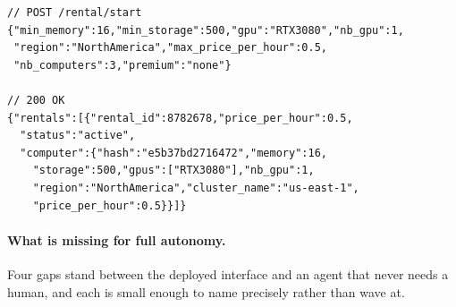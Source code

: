 \begin{lstlisting}[float=htbp, floatplacement=htbp,
  caption={\FluxEdge \texttt{POST /\allowbreak{}rental/\allowbreak{}start}: a representative agent-facing
request and response \srccode{pouwbackend/\allowbreak{}rest\_api/\allowbreak{}v1/\allowbreak{}openapi.yaml}{1330-1338,1358-1382}. The
request names criteria, not a specific machine, and \texttt{max\_price\_per\_hour} bounds this
one call. Nothing in the request, the response, or the bearer token that authorized the call
bounds what the same credential may spend across repeated calls --- the gap \S17
specifies.},label={lst:fluxedge-rental}]
// POST /rental/start
{"min_memory":16,"min_storage":500,"gpu":"RTX3080","nb_gpu":1,
 "region":"NorthAmerica","max_price_per_hour":0.5,
 "nb_computers":3,"premium":"none"}

// 200 OK
{"rentals":[{"rental_id":8782678,"price_per_hour":0.5,
  "status":"active",
  "computer":{"hash":"e5b37bd2716472","memory":16,
    "storage":500,"gpus":["RTX3080"],"nb_gpu":1,
    "region":"NorthAmerica","cluster_name":"us-east-1",
    "price_per_hour":0.5}}]}
\end{lstlisting}

\paragraph{What is missing for full autonomy.} Four gaps stand between the deployed interface and
an agent that never needs a human, and each is small enough to name precisely rather than wave at.

